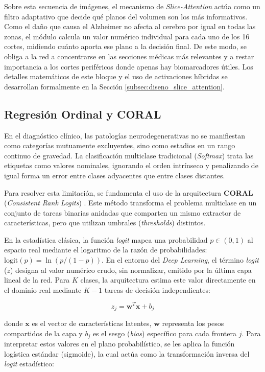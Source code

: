 \documentclass[12pt, oneside, english, spanish]{book}
\begin{document}
Sobre esta secuencia de imágenes, el mecanismo de \textit{Slice-Attention} actúa como un filtro adaptativo que decide qué planos del volumen son los más informativos. Como el daño que causa el Alzheimer no afecta al cerebro por igual en todas las zonas, el módulo calcula un valor numérico individual para cada uno de los 16 cortes, midiendo cuánto aporta ese plano a la decisión final. De este modo, se obliga a la red a concentrarse en las secciones médicas más relevantes y a restar importancia a los cortes periféricos donde apenas hay biomarcadores útiles. Los detalles matemáticos de este bloque y el uso de activaciones híbridas se desarrollan formalmente en la Sección \ref{subsec:diseno_slice_attention}.

\subsection{Regresión Ordinal y CORAL} \label{subsec:ordinal_coral_teoria}

En el diagnóstico clínico, las patologías neurodegenerativas no se manifiestan como categorías mutuamente excluyentes, sino como estadios en un rango continuo de gravedad. La clasificación multiclase tradicional (\textit{Softmax}) trata las etiquetas como valores nominales, ignorando el orden intrínseco y penalizando de igual forma un error entre clases adyacentes que entre clases distantes.

Para resolver esta limitación, se fundamenta el uso de la arquitectura \textbf{CORAL} (\textit{Consistent Rank Logits}) \cite{cao2020rank}. Este método transforma el problema multiclase en un conjunto de tareas binarias anidadas que comparten un mismo extractor de características, pero que utilizan umbrales (\textit{thresholds}) distintos. 

En la estadística clásica, la función \textit{logit} mapea una probabilidad $p \in (0,1)$ al espacio real mediante el logaritmo de la razón de probabilidades: $\text{logit}(p) = \ln(p / (1-p))$. En el entorno del \textit{Deep Learning}, el término \textit{logit} ($z$) designa al valor numérico crudo, sin normalizar, emitido por la última capa lineal de la red. Para $K$ clases, la arquitectura estima este valor directamente en el dominio real mediante $K-1$ tareas de decisión independientes:

\begin{equation}
	z_j = \mathbf{w}^T \mathbf{x} + b_j
\end{equation}

donde $\mathbf{x}$ es el vector de características latentes, $\mathbf{w}$ representa los pesos compartidos de la capa y $b_j$ es el sesgo (\textit{bias}) específico para cada frontera $j$. Para interpretar estos valores en el plano probabilístico, se les aplica la función logística estándar (sigmoide), la cual actúa como la transformación inversa del \textit{logit} estadístico:
\end{document}

